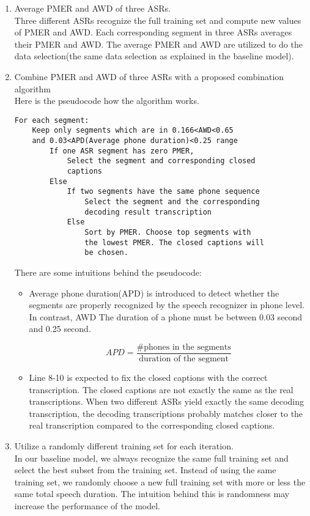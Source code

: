 \begin{enumerate}
\item Average PMER and AWD of three ASRs. \\
Three different ASRs recognize the full training set and compute new values of PMER and AWD. Each corresponding segment in three ASRs averages their PMER and AWD. The average PMER and AWD are utilized to do the data selection(the same data selection as explained in the baseline model).

\item Combine PMER and AWD of three ASRs with a proposed combination algorithm \\
Here is the pseudocode how the algorithm works.
\begin{lstlisting}[caption={the proposed combination algorithm}, label={algoCombine}]
For each segment:
    Keep only segments which are in 0.166<AWD<0.65 
    and 0.03<APD(Average phone duration)<0.25 range
        If one ASR segment has zero PMER, 
            Select the segment and corresponding closed 
            captions
        Else 
            If two segments have the same phone sequence 
                Select the segment and the corresponding 
                decoding result transcription 
            Else 
                Sort by PMER. Choose top segments with 
                the lowest PMER. The closed captions will 
                be chosen.
\end{lstlisting}
There are some intuitions behind the pseudocode:
\begin{itemize}
\item Average phone duration(APD) is introduced to detect whether the segments are properly recognized by the speech recognizer in phone level. In contrast, AWD  The duration of a phone must be between 0.03 second and 0.25 second.

\begin{equation}
APD = \frac{\#\textrm{phones in the segments}}{\textrm{duration of the segment}}
\end{equation}

\item Line 8-10 is expected to fix the closed captions with the correct transcription. The closed captions are not exactly the same as the real transcriptions. When two different ASRs yield exactly the same decoding transcription, the decoding transcriptions probably matches closer to the real transcription compared to the corresponding closed captions.

\end{itemize}

\item Utilize a randomly different training set for each iteration. \\
In our baseline model, we always recognize the same full training set and select the best subset from the training set. Instead of using the same training set, we randomly choose a new full training set with more or less the same total speech duration. The intuition behind this is randomness may increase the performance of the model.

\end{enumerate}

